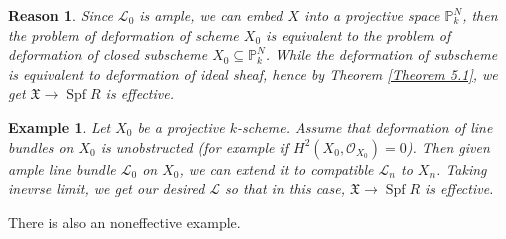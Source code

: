 \documentclass{ctexart}
\newtheorem{reason}{Reason}[section]
\newtheorem{example}{Example}[section]
\newcommand{\spf}{\operatorname{Spf}}
\begin{document}
\begin{reason}
    Since $\mathcal{L}_{0}$ is ample, we can embed $X$ into a projective space $\mathbb{P}_{k}^{N}$, 
    then the problem of deformation of scheme $X_{0}$ is equivalent to the problem of deformation of closed subscheme $X_{0} \subseteq \mathbb{P}_{k}^{N}$.
    While the deformation of subscheme is equivalent to deformation of ideal sheaf, 
    hence by Theorem \ref{Theorem 5.1}, we get $\mathfrak{X} \rightarrow \spf R$ is effective.
\end{reason}
\begin{example}
    Let $X_{0}$ be a projective $k$-scheme.
    Assume that deformation of line bundles on $X_{0}$ is unobstructed (for example if $H^{2}(X_{0}, \mathcal{O}_{X_{0}}) = 0$).
    Then given ample line bundle $\mathcal{L}_{0}$ on $X_{0}$, 
    we can extend it to compatible $\mathcal{L}_{n}$ to $X_{n}$.
    Taking inevrse limit, we get our desired $\mathcal{L}$ so that in this case, $\mathfrak{X} \rightarrow \spf R$ is effective.
\end{example}
There is also an noneffective example.
\end{document}
